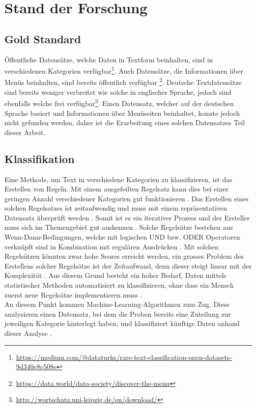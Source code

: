 \chapter{Stand der Forschung}
\section{Gold Standard}
Öffentliche Datensätze, welche Daten in Textform beinhalten, sind in verschiedenen Kategorien verfügbar\footnote{\url{https://medium.com/@dataturks/rare-text-classification-open-datasets-9d340c8c508e}}.
Auch Datensätze, die Informationen über Menüs beinhalten, sind bereits öffentlich verfügbar \footnote{\url{https://data.world/data-society/discover-the-menu}}.
Deutsche Textdatensätze sind bereits weniger verbreitet wie solche in englischer Sprache, jedoch sind ebenfalls welche frei verfügbar\footnote{\url{http://wortschatz.uni-leipzig.de/en/download/}}.
Einen Datensatz, welcher auf der deutschen Sprache basiert und Informationen über Menüseiten beinhaltet, konnte jedoch nicht gefunden werden, daher ist die Erarbeitung eines solchen Datensatzes Teil dieser Arbeit.
\section{Klassifikation}
Eine Methode, um Text in verschiedene Kategorien zu klassifizieren, ist das Erstellen von Regeln.
Mit einem ausgefeilten Regelsatz kann dies bei einer geringen Anzahl verschiedener Kategorien gut funktionieren \cite[p.125]{jackson2007natural}.
Das Erstellen eines solchen Regelsatzes ist zeitaufwendig und muss mit einem repräsentativen Datensatz überprüft werden \cite[p.125]{jackson2007natural}.
Somit ist es ein iterativer Prozess und der Ersteller muss sich im Themengebiet gut auskennen \cite[p.125]{jackson2007natural}.
Solche Regelsätze bestehen aus \glqq Wenn-Dann\grqq-Bedingungen, welche mit logischen \glqq UND\grqq{} bzw. \glqq ODER\grqq{} Operatoren verknüpft sind in Kombination mit regulären Ausdrücken \cite[p.126]{jackson2007natural}.
Mit solchen Regelsätzen könnten zwar hohe Scores erreicht werden, ein grosses Problem des Erstellens solcher Regelsätze ist der Zeitaufwand, denn dieser steigt linear mit der Komplexität \cite[p.127]{jackson2007natural}.
Aus diesem Grund besteht ein hoher Bedarf, Daten mittels statistischer Methoden automatisiert zu klassifizieren, ohne dass ein Mensch zuerst neue Regelsätze implementieren muss \cite[p.127]{jackson2007natural}.\\
An diesem Punkt kommen Machine-Learning-Algorithmen zum Zug.
Diese analysieren einen Datensatz, bei dem die Proben bereits eine Zuteilung zur jeweiligen Kategorie hinterlegt haben, und klassifiziert künftige Daten anhand dieser Analyse \cite[p.127]{jackson2007natural}. 
